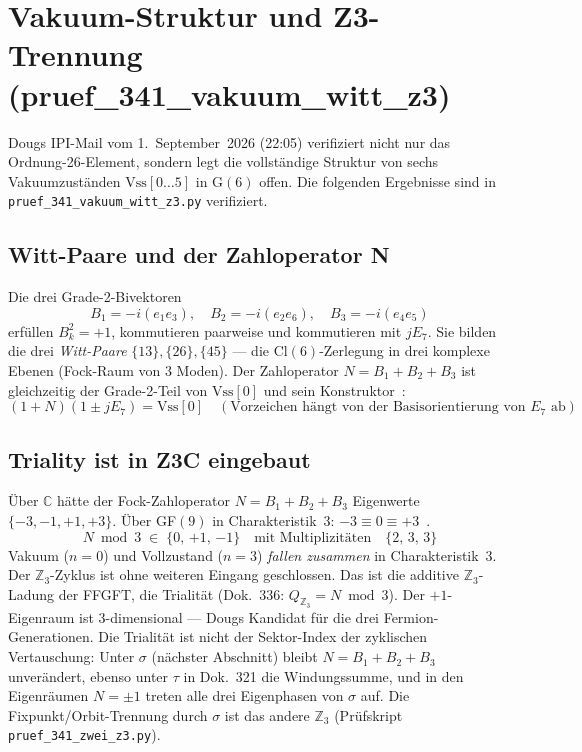 \section{Vakuum-Struktur und Z3-Trennung (pruef\_341\_vakuum\_witt\_z3)}

Dougs IPI-Mail vom 1.~September~2026 (22:05) verifiziert nicht nur das
Ordnung-26-Element, sondern legt die vollständige Struktur von sechs
Vakuumzuständen $\text{Vss}[0\ldots5]$ in G$(6)$ offen.
Die folgenden Ergebnisse sind in \texttt{pruef\_341\_vakuum\_witt\_z3.py} verifiziert.

\subsection{Witt-Paare und der Zahloperator N}

Die drei Grade-2-Bivektoren
\begin{equation}
  B_1 = -i(e_1 e_3),\quad B_2 = -i(e_2 e_6),\quad B_3 = -i(e_4 e_5)
\end{equation}
erfüllen $B_k^2 = +1$, kommutieren paarweise und kommutieren mit $jE_7$.
Sie bilden die drei \emph{Witt-Paare} $\{13\},\{26\},\{45\}$ ---
die Cl$(6)$-Zerlegung in drei komplexe Ebenen (Fock-Raum von 3 Moden).
Der Zahloperator $N = B_1 + B_2 + B_3$ ist gleichzeitig
der Grade-2-Teil von $\text{Vss}[0]$ und sein Konstruktor~\BM:
\begin{equation}
  (1+N)(1 \pm jE_7) = \text{Vss}[0]
  \quad (\text{Vorzeichen hängt von der Basisorientierung von } E_7 \text{ ab})
\end{equation}

\subsection{Triality ist in Z3C eingebaut}

Über $\mathbb{C}$ hätte der Fock-Zahloperator $N = B_1+B_2+B_3$
Eigenwerte $\{-3,-1,+1,+3\}$.
Über GF$(9)$ in Charakteristik~3: $-3 \equiv 0 \equiv +3$~\BM.
\begin{equation}
  N \bmod 3 \;\in\; \{0,\,{+1},\,{-1}\}
  \quad\text{mit Multiplizitäten}\quad \{2,\,3,\,3\}
\end{equation}
Vakuum ($n=0$) und Vollzustand ($n=3$) \emph{fallen zusammen} in Charakteristik~3.
Der $\mathbb{Z}_3$-Zyklus ist ohne weiteren Eingang geschlossen.
Das ist die additive $\mathbb{Z}_3$-Ladung der FFGFT, die Trialität
(Dok.~336: $Q_{\mathbb{Z}_3} = N \bmod 3$). Der $+1$-Eigenraum ist 3-dimensional ---
Dougs Kandidat für die drei Fermion-Generationen.
Die Trialität ist nicht der Sektor-Index der zyklischen Vertauschung: Unter $\sigma$
(nächster Abschnitt) bleibt $N=B_1+B_2+B_3$ unverändert, ebenso unter $\tau$ in Dok.~321
die Windungssumme, und in den Eigenräumen $N=\pm1$ treten alle drei Eigenphasen von
$\sigma$ auf. Die Fixpunkt/Orbit-Trennung durch $\sigma$ ist das andere $\mathbb{Z}_3$
(Prüfskript \texttt{pruef\_341\_zwei\_z3.py}).

